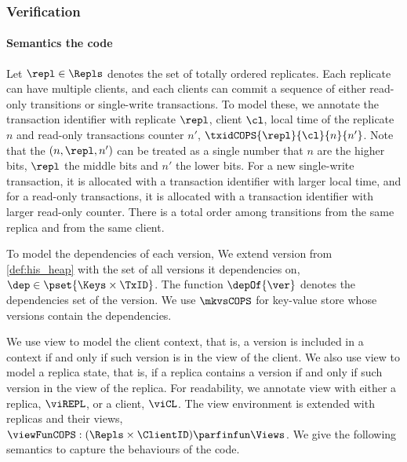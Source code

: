 \subsubsection{Verification}
\paragraph{\bf Semantics the code}
Let \( \repl \in \Repls \) denotes the set of totally ordered replicates.
Each replicate can have multiple clients, and 
each clients can commit a sequence of either read-only transitions or single-write transactions.
To model these, we annotate the transaction identifier with replicate \( \repl \), client \( \cl \), 
local time of the replicate \( n \) and read-only transactions counter \( n' \), \ie \( \txidCOPS{\repl}{\cl}{n}{n'} \).
Note that the \( (n, \repl, n') \) can be treated as a single number that \( n \) are the higher bits, 
\( \repl \) the middle bits and \( n' \) the lower bits.
For a new single-write transaction, it is allocated with a transaction identifier with larger local time,
and for a read-only transactions, it is allocated with a transaction identifier with larger read-only counter.
There is a total order among transitions from the same replica and from the same client.

To model the dependencies of each version,
We extend version from \cref{def:his_heap} 
with the set of all versions it dependencies on, \( \dep \in \pset{\Keys \times \TxID} \).
The function \( \depOf{\ver} \) denotes the dependencies set of the version.
We use \( \mkvsCOPS \) for key-value store whose versions contain the dependencies.

We use view to model the client context,
that is, a version is included in a context if and only if such version is in the view of the client.
We also use view to model a replica state,
that is, if a replica contains a version if and only if such version in the view of the replica.
For readability, we annotate view with either a replica, \( \viREPL \), or a client, \( \viCL \).
The view environment is extended with replicas and their views, \( \viewFunCOPS : (\Repls \times \ClientID ) \parfinfun \Views \).
We give the following semantics to capture the behaviours of the code.

